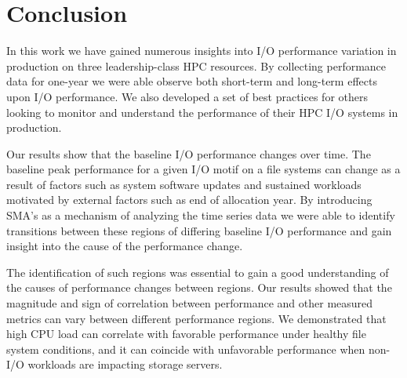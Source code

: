 \section{Conclusion} \label{sec:conclusions}

% 
% 
%
% 
%
%
%
% 
% 


In this work we have gained numerous insights into I/O performance variation in production on three leadership-class HPC resources. By collecting performance data for one-year we were able observe both short-term and long-term effects upon I/O performance. We also developed a set of best practices for others looking to monitor and understand the performance of their HPC I/O systems in production.

Our results show that the baseline I/O performance changes over time. The baseline peak performance for a given I/O motif on a file systems can change as a result of factors such as system software updates and sustained workloads motivated by external factors such as end of allocation year. By introducing SMA's as a mechanism of analyzing the time series data we were able to identify transitions between these regions of differing baseline I/O performance and gain insight into the cause of the performance change. 

The identification of such regions was essential to gain a good understanding of the causes of performance changes between regions. Our results showed that the magnitude and sign of correlation between performance and other measured metrics can vary between different performance regions.
We demonstrated that high CPU load can correlate with favorable performance under healthy file system conditions, and it can coincide with unfavorable performance when non-I/O workloads are impacting storage servers.

